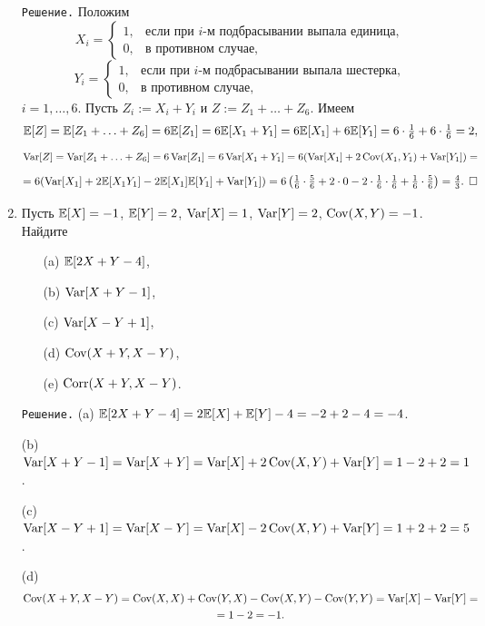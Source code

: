 \documentclass[12pt, a4paper]{article}\usepackage[]{graphicx}\usepackage[]{color}
\begin{document}
\begin{enumerate}
					\verb"Решение." Положим
					\[
					X_i =
					\begin{cases}
					1,     &   \text{если при $i$-м подбрасывании выпала единица,} \\
					0,     &   \text{в противном случае,}
					\end{cases}
					\]
					\[
					Y_i =
					\begin{cases}
					1,     &   \text{если при $i$-м подбрасывании выпала шестерка,} \\
					0,     &   \text{в противном случае,}
					\end{cases}
					\]
					$i=1, \ldots, 6$. Пусть $Z_i := X_i + Y_i$ и $Z := Z_1 + \ldots + Z_6$. Имеем
					\[
					\mathbb{E}[Z] = \mathbb{E}[Z_1 + \ldots + Z_6] = 6\mathbb{E}[Z_1] = 6\mathbb{E}[X_1 + Y_1] = 6\mathbb{E}[X_1] + 6\mathbb{E}[Y_1] = 6\cdot\tfrac{1}{6} + 6\cdot\tfrac{1}{6} = 2,
					\]
					\[
					\operatorname{Var}[Z] = \operatorname{Var}[Z_1 + \ldots + Z_6] = 6\operatorname{Var}[Z_1] = 6\operatorname{Var}[X_1 + Y_1] = 6(\operatorname{Var}[X_1] + 2\operatorname{Cov}(X_1,Y_1) + \operatorname{Var}[Y_1]) =
					\]
					\[
					= 6(\operatorname{Var}[X_1] + 2\mathbb{E}[X_1Y_1] - 2\mathbb{E}[X_1]\mathbb{E}[Y_1] + \operatorname{Var}[Y_1]) = 6\left( \tfrac{1}{6}\cdot\tfrac{5}{6} + 2\cdot0 - 2\cdot\tfrac{1}{6}\cdot\tfrac{1}{6} + \tfrac{1}{6}\cdot\tfrac{5}{6} \right) = \tfrac{4}{3}\text{. $\Box$}
					\]
					\item %
					Пусть $\mathbb{E}[X] = -1$, $\mathbb{E}[Y] = 2$, $\operatorname{Var}[X] = 1$, $\operatorname{Var}[Y] = 2$, $\operatorname{Cov}(X,Y) = -1$. Найдите
					\begin{itemize}
						\item[(a)] $\mathbb{E}[2X+Y-4]$,
						\item[(b)] $\operatorname{Var}[X+Y-1]$,
						\item[(c)] $\operatorname{Var}[X-Y+1]$,
						\item[(d)] $\operatorname{Cov}(X+Y,X-Y)$,
						\item[(e)] $\operatorname{Corr}(X+Y,X-Y)$.
					\end{itemize}

					\verb"Решение." (a) $\mathbb{E}[2X+Y-4] = 2\mathbb{E}[X] + \mathbb{E}[Y] - 4 = -2 + 2 - 4 = -4$.

					(b) $\operatorname{Var}[X+Y-1] = \operatorname{Var}[X+Y] = \operatorname{Var}[X] + 2\operatorname{Cov}(X,Y) + \operatorname{Var}[Y] = 1 - 2 + 2 = 1$.

					(c) $\operatorname{Var}[X-Y+1] = \operatorname{Var}[X-Y] = \operatorname{Var}[X] - 2\operatorname{Cov}(X,Y) + \operatorname{Var}[Y] = 1 + 2 + 2 = 5$.

					(d)
					\begin{multline}
					\operatorname{Cov}(X+Y, X-Y) = \operatorname{Cov}(X, X) + \operatorname{Cov}(Y, X) - \operatorname{Cov}(X, Y) - \operatorname{Cov}(Y, Y) = \operatorname{Var}[X] - \operatorname{Var}[Y] = \\
					= 1 - 2 = -1.
					\end{multline}


\end{enumerate}
\end{document}
